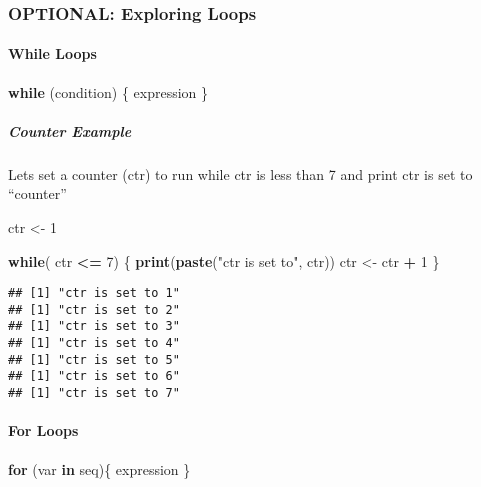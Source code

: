 \documentclass[]{article}
\newenvironment{Shaded}{\begin{snugshade}}{\end{snugshade}}
\newcommand{\KeywordTok}[1]{\textcolor[rgb]{0.13,0.29,0.53}{\textbf{#1}}}
\newcommand{\DecValTok}[1]{\textcolor[rgb]{0.00,0.00,0.81}{#1}}
\newcommand{\StringTok}[1]{\textcolor[rgb]{0.31,0.60,0.02}{#1}}
\newcommand{\ControlFlowTok}[1]{\textcolor[rgb]{0.13,0.29,0.53}{\textbf{#1}}}
\newcommand{\OperatorTok}[1]{\textcolor[rgb]{0.81,0.36,0.00}{\textbf{#1}}}
\newcommand{\NormalTok}[1]{#1}
\let\oldparagraph\paragraph
\renewcommand{\paragraph}[1]{\oldparagraph{#1}\mbox{}}
\let\oldsubparagraph\subparagraph
\renewcommand{\subparagraph}[1]{\oldsubparagraph{#1}\mbox{}}
\begin{document}
\subsubsection{OPTIONAL: Exploring
Loops}\label{optional-exploring-loops}

\paragraph{While Loops}\label{while-loops}

\begin{Shaded}
\begin{Highlighting}[]
\ControlFlowTok{while}\NormalTok{ (condition) \{}
\NormalTok{  expression}
\NormalTok{\}}
\end{Highlighting}
\end{Shaded}

\subparagraph{Counter Example}\label{counter-example}

Lets set a counter (ctr) to run while ctr is less than 7 and print ctr
is set to ``counter''

\begin{Shaded}
\begin{Highlighting}[]
\NormalTok{ctr <-}\StringTok{ }\DecValTok{1}

\ControlFlowTok{while}\NormalTok{( ctr }\OperatorTok{<=}\StringTok{ }\DecValTok{7}\NormalTok{) \{}
  \KeywordTok{print}\NormalTok{(}\KeywordTok{paste}\NormalTok{(}\StringTok{"ctr is set to"}\NormalTok{, ctr))}
\NormalTok{  ctr <-}\StringTok{ }\NormalTok{ctr }\OperatorTok{+}\StringTok{ }\DecValTok{1}
\NormalTok{\}}
\end{Highlighting}
\end{Shaded}

\begin{verbatim}
## [1] "ctr is set to 1"
## [1] "ctr is set to 2"
## [1] "ctr is set to 3"
## [1] "ctr is set to 4"
## [1] "ctr is set to 5"
## [1] "ctr is set to 6"
## [1] "ctr is set to 7"
\end{verbatim}

\paragraph{For Loops}\label{for-loops}

\begin{Shaded}
\begin{Highlighting}[]
\ControlFlowTok{for}\NormalTok{ (var }\ControlFlowTok{in}\NormalTok{ seq)\{}
\NormalTok{  expression}
\NormalTok{\}}
\end{Highlighting}
\end{Shaded}
\end{document}
